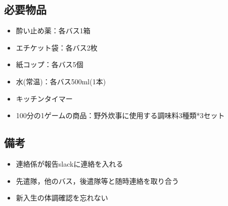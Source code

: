 \subsection{必要物品}
\begin{itemize}
\item 酔い止め薬：各バス1箱
\item エチケット袋：各バス2枚
\item 紙コップ：各バス5個
\item 水(常温)：各バス500ml(1本)
\item キッチンタイマー
\item 100分の1ゲームの商品：野外炊事に使用する調味料3種類*3セット
\end{itemize}

\subsection{備考}

\begin{itemize}
\item 連絡係が報告slackに連絡を入れる
\item 先遣隊，他のバス，後遣隊等と随時連絡を取り合う
\item 新入生の体調確認を忘れない
\end{itemize}


